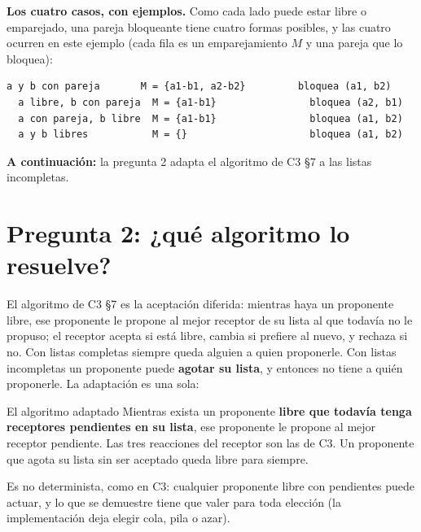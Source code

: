 \documentclass[11pt]{article}
\begin{document}
\noindent\begin{minipage}{\linewidth}
\textbf{Los cuatro casos, con ejemplos.} Como cada lado puede estar libre o emparejado, una pareja bloqueante
tiene cuatro formas posibles, y las cuatro ocurren en este ejemplo (cada fila es un emparejamiento $M$
y una pareja que lo bloquea):
\begin{lstlisting}[style=salida,basicstyle=\ttfamily\footnotesize\color{black},columns=fixed]
  a y b con pareja       M = {a1-b1, a2-b2}         bloquea (a1, b2)
  a libre, b con pareja  M = {a1-b1}                bloquea (a2, b1)
  a con pareja, b libre  M = {a1-b1}                bloquea (a1, b2)
  a y b libres           M = {}                     bloquea (a1, b2)
\end{lstlisting}
\end{minipage}
\textbf{A continuación:} la pregunta 2 adapta el algoritmo de C3 §7 a las listas incompletas.

\section{Pregunta 2: ¿qué algoritmo lo resuelve?}

El algoritmo de C3 §7 es la aceptación diferida: mientras haya un proponente libre, ese proponente le propone al
mejor receptor de su lista al que todavía no le propuso; el receptor acepta si está libre, cambia si prefiere al
nuevo, y rechaza si no. Con listas completas siempre queda alguien a quien proponerle. Con listas incompletas
un proponente puede \textbf{agotar su lista}, y entonces no tiene a quién proponerle. La adaptación es una sola:

\begin{resultado}{El algoritmo adaptado}
Mientras exista un proponente \textbf{libre que todavía tenga receptores pendientes en su lista}, ese proponente
le propone al mejor receptor pendiente. Las tres reacciones del receptor son las de C3. Un proponente que agota
su lista sin ser aceptado queda libre para siempre.
\end{resultado}

Es no determinista, como en C3: cualquier proponente libre con pendientes puede actuar, y lo que se demuestre
tiene que valer para toda elección (la implementación deja elegir cola, pila o azar).
\end{document}
